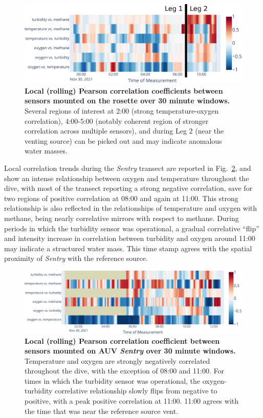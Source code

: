 \begin{figure}[h!]
    \centering
    \includegraphics[width=\columnwidth]{figures/chap3_rosette_local_corr_all.jpg}
    \caption[Local (rolling) Pearson correlation coefficients for rosette mounted instruments]{\textbf{Local (rolling) Pearson correlation coefficients between sensors mounted on the rosette over 30 minute windows.} Several regions of interest at 2:00 (strong temperature-oxygen correlation), 4:00-5:00 (notably coherent region of stronger correlation across multiple sensors), and during Leg 2 (near the venting source) can be picked out and may indicate anomalous water masses.}
    \label{fig:rosette_local}
\end{figure}

Local correlation trends during the \emph{Sentry} transect are reported in Fig.~\ref{fig:sentry_local}, and show an intense relationship between oxygen and temperature throughout the dive, with most of the transect reporting a strong negative correlation, save for two regions of positive correlation at 08:00 and again at 11:00. This strong relationship is also reflected in the relationships of temperature and oxygen with methane, being nearly correlative mirrors with respect to methane. During periods in which the turbidity sensor was operational, a gradual correlative ``flip'' and intensity increase in correlation between turbidity and oxygen around 11:00 may indicate a structured water mass. This time stamp agrees with the spatial proximity of \emph{Sentry} with the reference source.

\begin{figure}[h!]
    \centering
    \includegraphics[width=1\columnwidth]{figures/chap3_sentry_local_corr_all.jpg}
    \caption[Local (rolling) Pearson correlation coefficients for AUV \Sentry mounted instruments]{\textbf{Local (rolling) Pearson correlation coefficient between sensors mounted on AUV \emph{Sentry} over 30 minute windows.} Temperature and oxygen are strongly negatively correlated throughout the dive, with the exception of 08:00 and 11:00. For times in which the turbidity sensor was operational, the oxygen-turbidity correlative relationship slowly flips from negative to positive, with a peak positive correlation at 11:00. 11:00 agrees with the time that \Sentry was near the reference source vent.}
    \label{fig:sentry_local}
\end{figure}

